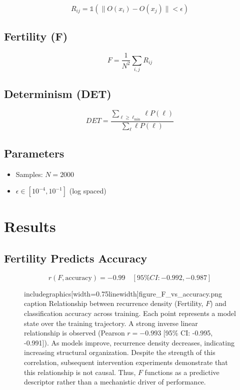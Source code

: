 \documentclass[11pt]{article}
\begin{document}
\[
	R_{ij} = \mathbb{1}(\|O(x_i) - O(x_j)\| < \epsilon)
\]

\subsection{Fertility (F)}

\[
	F = \frac{1}{N^2} \sum_{i,j} R_{ij}
\]

\subsection{Determinism (DET)}

\[
	DET = \frac{\sum_{\ell \geq \ell_{\min}} \ell P(\ell)}{\sum_{\ell} \ell P(\ell)}
\]

\subsection{Parameters}

\begin{itemize}
	\item Samples: $N = 2000$
	\item $\epsilon \in [10^{-4}, 10^{-1}]$ (log spaced)
\end{itemize}

\section{Results}

\subsection{Fertility Predicts Accuracy}

\[
	r(F, \text{accuracy}) = -0.99 \quad [95\% CI: -0.992, -0.987]
\]

\begin{figure}[H]
	\centering
	includegraphics[width=0.75linewidth]{figure_F_vs_accuracy.png}
	caption{
			Relationship between recurrence density (Fertility, $F$) and classification accuracy across training.
			Each point represents a model state over the training trajectory.
			A strong inverse linear relationship is observed (Pearson $r = -0.993$ [95\% CI: -0.995, -0.991]).
			As models improve, recurrence density decreases, indicating increasing structural organization.
			Despite the strength of this correlation, subsequent intervention experiments demonstrate that this relationship is not causal.
			Thus, $F$ functions as a predictive descriptor rather than a mechanistic driver of performance.
		}
	\label{fig:F_accuracy}
\end{figure}
\end{document}
